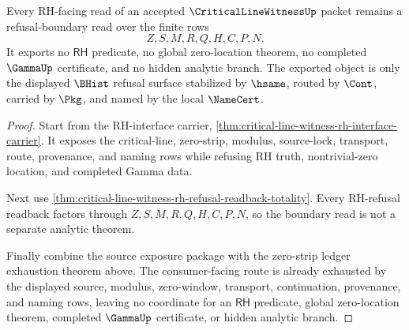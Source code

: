 \begin{theorem}
\label{thm:critical-line-witness-rh-boundary-refusal-totality}
Every RH-facing read of an accepted $\CriticalLineWitnessUp$ packet remains a refusal-boundary read over the finite rows
$$
Z,S,M,R,Q,H,C,P,N.
$$
It exports no $\mathsf{RH}$ predicate, no global zero-location theorem, no completed $\GammaUp$ certificate, and no hidden analytic branch. The exported object is only the displayed $\BHist$ refusal surface stabilized by $\hsame$, routed by $\Cont$, carried by $\Pkg$, and named by the local $\NameCert$.
\end{theorem}
\begin{proof}
Start from the RH-interface carrier, \autoref{thm:critical-line-witness-rh-interface-carrier}. It exposes the critical-line, zero-strip, modulus, source-lock, transport, route, provenance, and naming rows while refusing RH truth, nontrivial-zero location, and completed Gamma data.

Next use \autoref{thm:critical-line-witness-rh-refusal-readback-totality}. Every RH-refusal readback factors through $Z,S,M,R,Q,H,C,P,N$, so the boundary read is not a separate analytic theorem.

Finally combine the source exposure package with the zero-strip ledger exhaustion theorem above. The consumer-facing route is already exhausted by the displayed source, modulus, zero-window, transport, continuation, provenance, and naming rows, leaving no coordinate for an $\mathsf{RH}$ predicate, global zero-location theorem, completed $\GammaUp$ certificate, or hidden analytic branch.
\end{proof}

